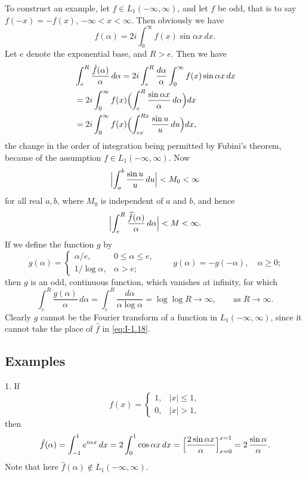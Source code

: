To construct an example, let $f\in L_1(-\infty,\infty)$, and let $f$ be odd, that is to say $f(-x)=-f(x)$, $-\infty<x<\infty$. Then obviously we have
\begin{equation*}
\hat f(\alpha)=2i\int_0^\infty f(x)\sin\alpha x\,dx.
\end{equation*}
Let $e$ denote the exponential base, and $R>e$. Then we have
\begin{align*}
&\int_e^R\frac{\hat f(\alpha)}{\alpha}\,d\alpha
=2i\int_e^R\frac{d\alpha}{\alpha}\int_0^\infty f(x)\sin\alpha x\,dx\\
&=2i\int_0^\infty f(x)\Bigl(\int_e^R\frac{\sin\alpha x}{\alpha}\,d\alpha\Bigr)dx\\
&=2i\int_0^\infty f(x)\Bigl(\int_{ex}^{Rx}\frac{\sin u}{u}\,du\Bigr)dx,
\end{align*}
the change in the order of integration being permitted by Fubini's theorem, because of the assumption $f\in L_1(-\infty,\infty)$. Now
\begin{equation*}
\Bigl|\int_a^b\frac{\sin u}{u}\,du\Bigr|<M_0<\infty
\end{equation*}
for all real $a,b$, where $M_0$ is independent of $a$ and $b$, and hence
\begin{equation}\label{eq:I-1.18}
\Bigl|\int_e^R\frac{\widehat f(\alpha)}{\alpha}\,d\alpha\Bigr|<M<\infty.
\end{equation}
If we define the function $g$ by
\begin{equation*}
g(\alpha)=
\begin{cases}
\alpha/e,&0\le\alpha\le e,\\
1/\log\alpha,&\alpha>e;
\end{cases}
\qquad g(\alpha)=-g(-\alpha),\quad\alpha\ge 0;
\end{equation*}
then $g$ is an odd, continuous function, which vanishes at infinity, for which
\begin{equation*}
\int_e^R\frac{g(\alpha)}{\alpha}\,d\alpha
=\int_e^R\frac{d\alpha}{\alpha\log\alpha}
=\log\log R\to\infty,\qquad\text{as }R\to\infty.
\end{equation*}
Clearly $g$ cannot be the Fourier transform of a function in $L_1(-\infty,\infty)$, since it cannot take the place of $\hat f$ in \eqref{eq:I-1.18}.

\subsection*{Examples}
1. If
\begin{equation*}
f(x)=
\begin{cases}
1,&|x|\le 1,\\
0,&|x|>1,
\end{cases}
\end{equation*}
then
\begin{equation*}
\hat f(\alpha)=\int_{-1}^1 e^{i\alpha x}\,dx
=2\int_0^1\cos\alpha x\,dx
=\Bigl[\frac{2\sin\alpha x}{\alpha}\Bigr]_{x=0}^{x=1}
=2\,\frac{\sin\alpha}{\alpha}.
\end{equation*}
Note that here $\hat f(\alpha)\notin L_1(-\infty,\infty)$.

